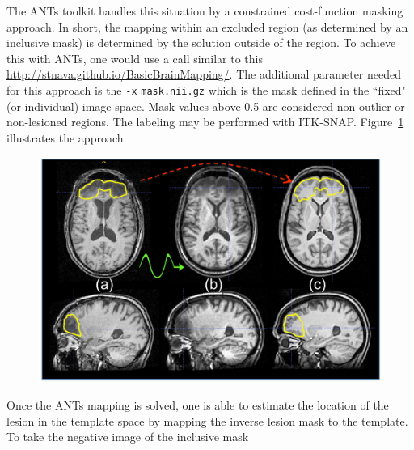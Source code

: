 \documentclass{InsightArticle}
\begin{document}
The ANTs toolkit handles this situation by a constrained cost-function
masking approach. In short, the mapping within an excluded region (as
determined by an inclusive mask) is determined by the solution outside
of the region. To achieve this with ANTs, one would use a call similar
to this \href{http://stnava.github.io/BasicBrainMapping/}{http://stnava.github.io/BasicBrainMapping/}.
The additional parameter needed for this approach 
is the \texttt{-x}  \texttt{mask.nii.gz}  which 
is the mask defined in the ``fixed" (or individual) image space.  
Mask values above 0.5 are considered non-outlier or non-lesioned regions.
The labeling may be performed with ITK-SNAP. 
Figure~\ref{fig:lesion} illustrates the approach.
\begin{figure}
\includegraphics[width=1\textwidth]{Figures/lesionstudy.pdf}
\label{fig:lesion}
\end{figure}
Once the ANTs mapping is solved, 
one is able to estimate the location of the lesion in the template space by mapping the inverse lesion mask to the template.
To take the negative image of the inclusive mask 
\end{document}
